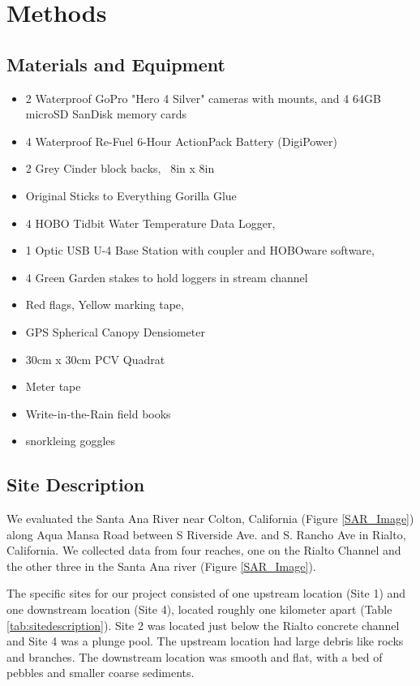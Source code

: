 \documentclass{article}\usepackage[]{graphicx}\usepackage[]{color}
\begin{document}
\section{Methods}

\subsection{Materials and Equipment}
\begin{itemize}
\item 2 Waterproof GoPro "Hero 4 Silver" cameras with mounts, and 4 64GB microSD SanDisk memory cards
\item 4 Waterproof Re-Fuel 6-Hour ActionPack Battery (DigiPower)
\item 2 Grey Cinder block backs, ~8in x 8in
\item Original Sticks to Everything Gorilla Glue
\item 4 HOBO Tidbit Water Temperature Data Logger,
\item 1 Optic USB U-4 Base Station with coupler and HOBOware software,
\item 4 Green Garden stakes to hold loggers in stream channel
\item Red flags, Yellow marking tape,
\item GPS Spherical Canopy Densiometer
\item 30cm x 30cm PCV Quadrat
\item Meter tape
\item Write-in-the-Rain field books
\item snorkleing goggles 
\end{itemize}

\subsection{Site Description}

We evaluated the Santa Ana River near Colton, California (Figure \ref{SAR_Image}) along Aqua Mansa Road between S Riverside Ave. and S. Rancho Ave in Rialto, California.  We collected data from four reaches, one on the Rialto Channel and the other three in the Santa Ana river (Figure \ref{SAR_Image}). 

The specific sites for our project consisted of one upstream location (Site 1) and one downstream location (Site 4), located roughly one kilometer apart (Table \ref{tab:sitedescription}). Site 2 was located just below the Rialto concrete channel and Site 4 was a plunge pool. The upstream location had large debris like rocks and branches. The downstream location was smooth and flat, with a bed of pebbles and smaller coarse sediments. 
\end{document}
